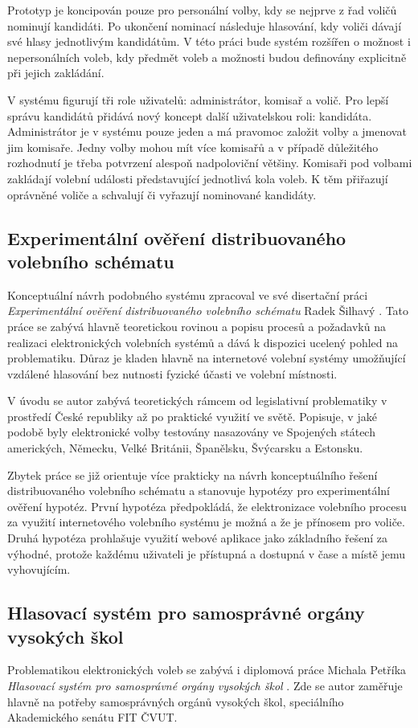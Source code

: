 \documentclass[11pt,twoside,a4paper]{book}
\begin{document}
Prototyp je koncipován pouze pro personální volby, kdy se nejprve z řad voličů nominují kandidáti. Po ukončení nominací následuje hlasování, kdy voliči dávají své hlasy jednotlivým kandidátům. V této práci bude systém rozšířen o možnost i nepersonálních voleb, kdy předmět voleb a možnosti budou definovány explicitně při jejich zakládání.

V systému figurují tři role uživatelů: administrátor, komisař a volič. Pro lepší správu kandidátů přidává nový koncept další uživatelskou roli: kandidáta. Administrátor je v systému pouze jeden a má pravomoc založit volby a jmenovat jim komisaře. Jedny volby mohou mít více komisařů a v případě důležitého rozhodnutí je třeba potvrzení alespoň nadpoloviční většiny. Komisaři pod volbami zakládají volební události představující jednotlivá kola voleb. K těm přiřazují oprávněné voliče a schvalují či vyřazují nominované kandidáty.

\subsection{Experimentální ověření distribuovaného volebního schématu}
Konceptuální návrh podobného systému zpracoval ve své disertační práci \textit{Experimentální ověření distribuovaného
volebního schématu} Radek Šilhavý \cite{art:silhavy}. Tato práce se zabývá hlavně teoretickou rovinou a popisu procesů a požadavků na realizaci elektronických volebních systémů a dává k dispozici ucelený pohled na problematiku. Důraz je kladen hlavně na internetové volební systémy umožňující vzdálené hlasování bez nutnosti fyzické účasti ve volební místnosti.

V úvodu se autor zabývá teoretických rámcem od legislativní problematiky v prostředí České republiky až po praktické využití ve světě. Popisuje, v jaké podobě byly elektronické volby testovány nasazovány ve Spojených státech amerických, Německu, Velké Británii, Španělsku, Švýcarsku a Estonsku.

Zbytek práce se již orientuje více prakticky na návrh konceptuálního řešení distribuovaného volebního schématu a stanovuje hypotézy pro experimentální ověření hypotéz. První hypotéza předpokládá, že elektronizace volebního procesu za využití internetového volebního systému je možná a že je přínosem pro voliče. Druhá hypotéza prohlašuje využití webové aplikace jako základního řešení za výhodné, protože každému uživateli je přístupná a dostupná v čase a místě jemu vyhovujícím.

\subsection{Hlasovací systém pro samosprávné orgány vysokých škol}
Problematikou elektronických voleb se zabývá i diplomová práce Michala Petříka \textit{Hlasovací systém pro samosprávné orgány vysokých škol} \cite{art:petrik}. Zde se autor zaměřuje hlavně na potřeby samosprávných orgánů vysokých škol, speciálního Akademického senátu FIT ČVUT. 
\end{document}
